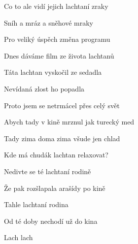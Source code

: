\begin{song}
\bigskip

Co to ale vidí jejich lachtaní zraky \par
{}Sníh a mráz a sněhové mraky \par
{}Pro veliký úspěch změna programu \par
Dnes dáváme film ze života lachtanů \par

\bigskip

\Refren

\bigskip

Táta lachtan vyskočil ze sedadla \par
{}Nevídaná zlost ho popadla \par
{}Proto jsem se netrmácel přes celý svět \par
Abych tady v kině mrznul jak turecký med \par

\bigskip

Tady zima doma zima všude jen chlad \par
{}Kde má chudák lachtan relaxovat? \par
{}Nedivte se té lachtaní rodině \par
Že pak rozšlapala arašídy po kině \par

\bigskip

\Refren

\bigskip

Tahle lachtaní rodina \par
{}Od té doby nechodí už do kina \par
Lach lach \par

\end{song}
